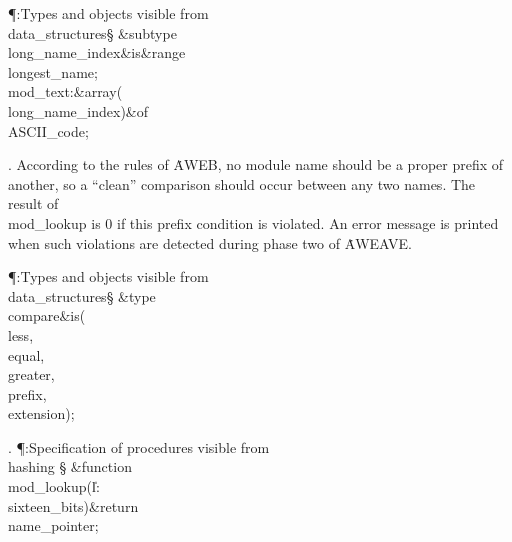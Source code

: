 \Y\P\?\4:Types and objects visible from \\{data\_structures}\X\mathrel{+}\S%
\?\6
\&{subtype}\8\\{long\_name\_index}\8\&{is}\8\8\&{range}\?\to\?%
\\{longest\_name};\6
\\{mod\_text}\?:\1\&{array}\8\1(\?\\{long\_name\_index}\?\2)\2\8\&{of}\?\8%
\\{ASCII\_code};\par
\fi

. According to the rules of \.{AWEB}, no module name should be a proper
prefix
of another, so a ``clean'' comparison should occur between any two names. The
result of \\{mod\_lookup} is 0 if this prefix condition is violated. An error
message is printed when such violations are detected during phase two of
\.{AWEAVE}.

\Y\P\?\4:Types and objects visible from \\{data\_structures}\X\mathrel{+}\S%
\?\6
\&{type}\8\\{compare}\8\&{is}\?\8\1(\?\\{less}\?,\?\\{equal}\?,\?%
\\{greater}\?,\?\\{prefix}\?,\?\\{extension}\?\2)\?;\par
\fi

. \P\?:Specification of procedures visible from \\{hashing}\X%
\mathrel{+}\S\?\6
\&{function}\8\1\\{mod\_lookup}\?(\1\?\|l\?:\?\\{sixteen\_bits}\?\2)\&{return}%
\?\8\\{name\_pointer}\2;\par
\fi

